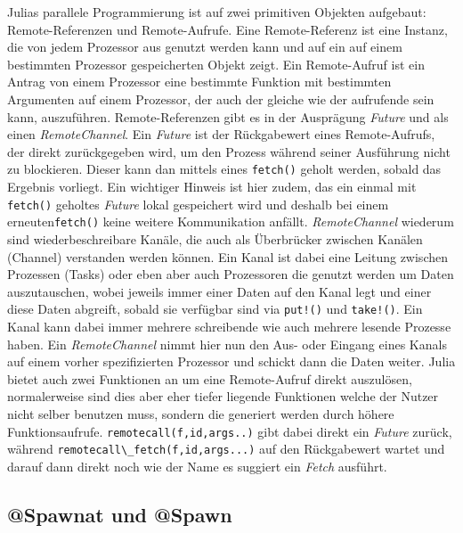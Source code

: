 \documentclass[proseminar,german,utf8]{zihpub}
\begin{document}
Julias parallele Programmierung ist auf zwei primitiven Objekten aufgebaut: Remote-Referenzen und Remote-Aufrufe. Eine Remote-Referenz ist eine Instanz, die von jedem Prozessor aus genutzt werden kann und auf ein auf einem bestimmten Prozessor gespeicherten Objekt zeigt. Ein Remote-Aufruf ist ein Antrag von einem Prozessor eine bestimmte Funktion mit bestimmten Argumenten auf einem Prozessor, der auch der gleiche wie der aufrufende sein kann, auszuführen. Remote-Referenzen gibt es in der Ausprägung \textit{Future} und als einen \textit{RemoteChannel}. Ein \textit{Future} ist der Rückgabewert eines Remote-Aufrufs, der direkt zurückgegeben wird, um den Prozess während seiner Ausführung nicht zu blockieren. Dieser kann dan mittels eines \verb|fetch()| geholt werden, sobald das Ergebnis vorliegt. Ein wichtiger Hinweis ist hier zudem, das ein einmal mit \verb|fetch()| geholtes \textit{Future} lokal gespeichert wird und deshalb bei einem erneuten\verb|fetch()| keine weitere Kommunikation anfällt. \textit{RemoteChannel} wiederum sind wiederbeschreibare Kanäle, die auch als Überbrücker zwischen Kanälen (Channel) verstanden werden können. Ein Kanal ist dabei eine Leitung zwischen Prozessen (Tasks) oder eben aber auch Prozessoren die genutzt werden um Daten auszutauschen, wobei jeweils immer einer Daten auf den Kanal legt und einer diese Daten abgreift, sobald sie verfügbar sind via \verb|put!()| und \verb|take!()|. Ein Kanal kann dabei immer mehrere schreibende wie auch mehrere lesende Prozesse haben. Ein \textit{RemoteChannel} nimmt hier nun den Aus- oder Eingang eines Kanals auf einem vorher spezifizierten Prozessor und schickt dann die Daten weiter. Julia bietet auch zwei Funktionen an um eine Remote-Aufruf direkt auszulösen, normalerweise sind dies aber eher tiefer liegende Funktionen welche der Nutzer nicht selber benutzen muss, sondern die generiert werden durch höhere Funktionsaufrufe. \verb|remotecall(f,id,args..)| gibt dabei direkt ein \textit{Future} zurück, während \verb|remotecall\_fetch(f,id,args...)| auf den Rückgabewert wartet und darauf dann direkt noch wie der Name es suggiert ein \textit{Fetch} ausführt.

\subsection{@Spawnat und @Spawn}
\end{document}
